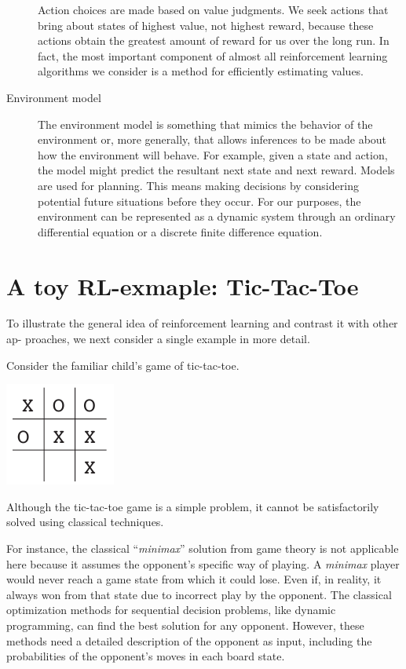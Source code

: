 \documentclass[
  letterpaper,
  DIV=11,
  numbers=noendperiod]{scrreprt}
\theoremstyle{definition}
\theoremstyle{remark}
\begin{document}
\begin{description}
Action choices are made based on value judgments. We seek actions that
bring about states of highest value, not highest reward, because these
actions obtain the greatest amount of reward for us over the long run.
In fact, the most important component of almost all reinforcement
learning algorithms we consider is a method for efficiently estimating
values.
\item[Environment model]
The environment model is something that mimics the behavior of the
environment or, more generally, that allows inferences to be made about
how the environment will behave. For example, given a state and action,
the model might predict the resultant next state and next reward. Models
are used for planning. This means making decisions by considering
potential future situations before they occur. For our purposes, the
environment can be represented as a dynamic system through an ordinary
differential equation or a discrete finite difference equation.
\end{description}

\section{A toy RL-exmaple:
Tic-Tac-Toe}\label{a-toy-rl-exmaple-tic-tac-toe}

To illustrate the general idea of reinforcement learning and contrast it
with other ap- proaches, we next consider a single example in more
detail.

Consider the familiar child's game of tic-tac-toe.

\includegraphics{02-introductionToRL/../assets/tic_tac_toe.jpeg}

Although the tic-tac-toe game is a simple problem, it cannot be
satisfactorily solved using classical techniques.

For instance, the classical ``\emph{minimax}'' solution from game theory
is not applicable here because it assumes the opponent's specific way of
playing. A \emph{minimax} player would never reach a game state from
which it could lose. Even if, in reality, it always won from that state
due to incorrect play by the opponent. The classical optimization
methods for sequential decision problems, like dynamic programming, can
find the best solution for any opponent. However, these methods need a
detailed description of the opponent as input, including the
probabilities of the opponent's moves in each board state.
\end{document}

